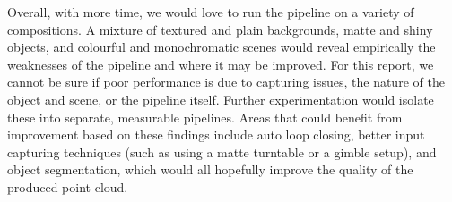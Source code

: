 \documentclass[conference]{assets/latex/IEEEtran}
\begin{document}
Overall, with more time, we would love to run the pipeline on a variety of compositions. A mixture of textured and plain backgrounds, matte and shiny objects, and colourful and monochromatic scenes would reveal empirically the weaknesses of the pipeline and where it may be improved. For this report, we cannot be sure if poor performance is due to capturing issues, the nature of the object and scene, or the pipeline itself. Further experimentation would isolate these into separate, measurable pipelines. Areas that could benefit from improvement based on these findings include auto loop closing, better input capturing techniques (such as using a matte turntable or a gimble setup), and object segmentation, which would all hopefully improve the quality of the produced point cloud.

\printbibliography
\end{document}
